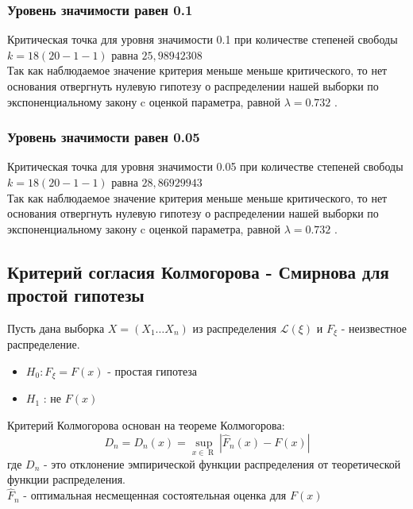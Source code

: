 \documentclass[a4paper,12pt, oneside]{book}
\begin{document}
\subsubsection{Уровень значимости равен 0.1}

Критическая точка для уровня значимости 0.1 при количестве степеней свободы $ k = 18(20 - 1 - 1) $ равна $25,98942308$\\

Так как наблюдаемое значение критерия меньше меньше критического, то нет основания отвергнуть нулевую гипотезу о распределении нашей выборки по экспоненциальному закону c оценкой параметра, равной $ \lambda = 0.732 $ .  



\subsubsection{Уровень значимости равен 0.05} 

Критическая точка для уровня значимости 0.05 при количестве степеней свободы $ k = 18 (20 - 1 - 1) $ равна $28,86929943$\\

Так как наблюдаемое значение критерия меньше меньше критического, то нет основания отвергнуть нулевую гипотезу о распределении нашей выборки по экспоненциальному закону c оценкой параметра, равной $ \lambda = 0.732 $ .  







\subsection{Критерий согласия Колмогорова - Смирнова для простой гипотезы}

Пусть дана выборка $X = (X_1 \ldots X_n)$ из распределения $\mathscr{L}(\xi)$ и $F_\xi$ - неизвестное распределение.

\begin{itemize}
	\item $H_0 : F_\xi = F(x)$ - простая гипотеза
	\item $H_1$ : не $F(x)$
\end{itemize}
Критерий Колмогорова основан на теореме Колмогорова:
\[
D_n = D_n(x) = \underset{x \in \mathop{R}}{\sup } |\hat{F}_n(x) - F(x) |
\]
где $D_n$ - это отклонение эмпирической функции распределения от теоретической функции распределения.
\\
$\hat{F}_n$ - оптимальная несмещенная состоятельная оценка для $F(x)$
\\
\end{document}
